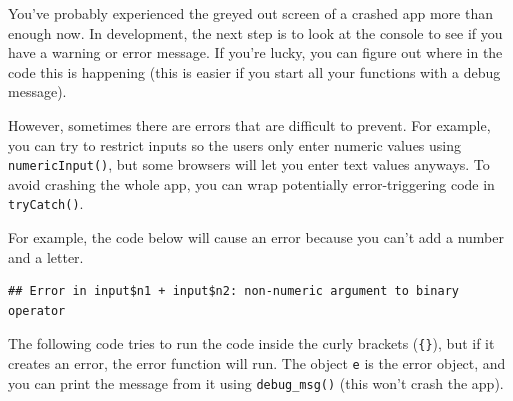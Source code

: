 \documentclass[
]{book}
\newenvironment{Shaded}{\begin{snugshade}}{\end{snugshade}}
\newcommand{\AttributeTok}[1]{\textcolor[rgb]{0.77,0.63,0.00}{#1}}
\newcommand{\ControlFlowTok}[1]{\textcolor[rgb]{0.13,0.29,0.53}{\textbf{#1}}}
\newcommand{\DecValTok}[1]{\textcolor[rgb]{0.00,0.00,0.81}{#1}}
\newcommand{\FunctionTok}[1]{\textcolor[rgb]{0.00,0.00,0.00}{#1}}
\newcommand{\NormalTok}[1]{#1}
\newcommand{\OtherTok}[1]{\textcolor[rgb]{0.56,0.35,0.01}{#1}}
\newcommand{\SpecialCharTok}[1]{\textcolor[rgb]{0.00,0.00,0.00}{#1}}
\newcommand{\StringTok}[1]{\textcolor[rgb]{0.31,0.60,0.02}{#1}}
\begin{document}
You've probably experienced the greyed out screen of a crashed app more than enough now. In development, the next step is to look at the console to see if you have a warning or error message. If you're lucky, you can figure out where in the code this is happening (this is easier if you start all your functions with a debug message).

However, sometimes there are errors that are difficult to prevent. For example, you can try to restrict inputs so the users only enter numeric values using \texttt{numericInput()}, but some browsers will let you enter text values anyways. To avoid crashing the whole app, you can wrap potentially error-triggering code in \texttt{tryCatch()}.

For example, the code below will cause an error because you can't add a number and a letter.

\begin{Shaded}
\end{Shaded}

\begin{verbatim}
## Error in input$n1 + input$n2: non-numeric argument to binary operator
\end{verbatim}

The following code tries to run the code inside the curly brackets (\texttt{\{\}}), but if it creates an error, the error function will run. The object \texttt{e} is the error object, and you can print the message from it using \texttt{debug\_msg()} (this won't crash the app).

\begin{Shaded}
\end{Shaded}
\end{document}
